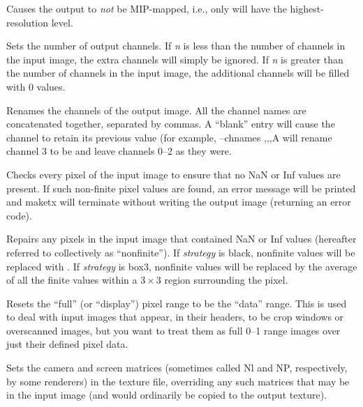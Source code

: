 Causes the output to \emph{not} be MIP-mapped, i.e., only will have
the highest-resolution level.
\apiend

Sets the number of output channels.  If \emph{n} is less than the 
number of channels in the input image, the extra channels will simply
be ignored.  If \emph{n} is greater than the number of channels in the
input image, the additional channels will be filled with 0 values.
\apiend

Renames the channels of the output image.  All the channel names are
concatenated together, separated by commas.  A ``blank'' entry will cause
the channel to retain its previous value (for example, {\cf --chnames ,,,A}
will rename channel 3 to be  and leave channels 0--2 as they were.
\apiend

Checks every pixel of the input image to ensure that no NaN or Inf
values are present.  If such non-finite pixel values are found, 
an error message will be printed and {\cf maketx} will terminate without
writing the output image (returning an error code).
\apiend

Repairs any pixels in the input image that contained {\cf NaN} or 
{\cf Inf} values (hereafter referred to collectively as ``nonfinite'').
If \emph{strategy} is {\cf black}, nonfinite values will be replaced
with {}.  If \emph{strategy} is {\cf box3}, nonfinite values will
be replaced by the average of all the finite values within a $3 \times 3$
region surrounding the pixel.
\apiend

Resets the ``full'' (or ``display'') pixel range to be the ``data''
range.  This is used to deal with input images that appear, in their
headers, to be crop windows or overscanned images, but you want to treat
them as full 0--1 range images over just their defined pixel data.
\apiend


Sets the camera and screen matrices (sometimes called {\cf Nl} and
{\cf NP}, respectively, by some renderers) in the texture file, 
overriding any such matrices that may be in the input image (and would
ordinarily be copied to the output texture).
\apiend


